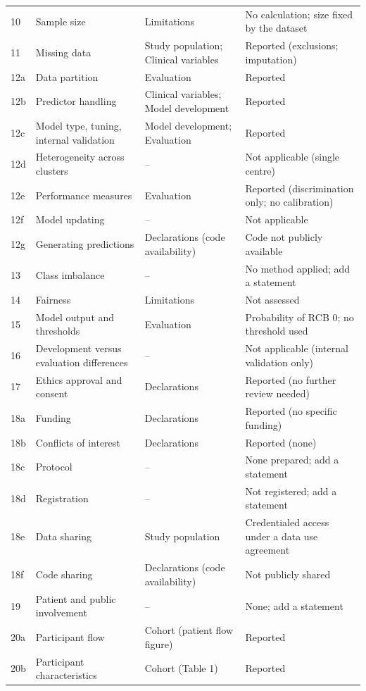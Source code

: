 \documentclass[10pt,a4paper,twocolumn]{article}
\begin{document}
\begin{longtable}{@{}l p{} p{} p{}@{}}
10 & Sample size & Limitations & No calculation; size fixed by the dataset \\
11 & Missing data & Study population; Clinical variables & Reported (exclusions; imputation) \\
12a & Data partition & Evaluation & Reported \\
12b & Predictor handling & Clinical variables; Model development & Reported \\
12c & Model type, tuning, internal validation & Model development; Evaluation & Reported \\
12d & Heterogeneity across clusters & -- & Not applicable (single centre) \\
12e & Performance measures & Evaluation & Reported (discrimination only; no calibration) \\
12f & Model updating & -- & Not applicable \\
12g & Generating predictions & Declarations (code availability) & Code not publicly available \\
13 & Class imbalance & -- & No method applied; add a statement \\
14 & Fairness & Limitations & Not assessed \\
15 & Model output and thresholds & Evaluation & Probability of RCB 0; no threshold used \\
16 & Development versus evaluation differences & -- & Not applicable (internal validation only) \\
17 & Ethics approval and consent & Declarations & Reported (no further review needed) \\
18a & Funding & Declarations & Reported (no specific funding) \\
18b & Conflicts of interest & Declarations & Reported (none) \\
18c & Protocol & -- & None prepared; add a statement \\
18d & Registration & -- & Not registered; add a statement \\
18e & Data sharing & Study population & Credentialed access under a data use agreement \\
18f & Code sharing & Declarations (code availability) & Not publicly shared \\
19 & Patient and public involvement & -- & None; add a statement \\
20a & Participant flow & Cohort (patient flow figure) & Reported \\
20b & Participant characteristics & Cohort (Table 1) & Reported \\

\end{longtable}
\end{document}

